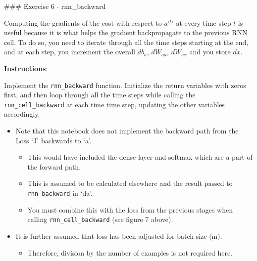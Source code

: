 \documentclass[11pt]{article}
\providecommand{\tightlist}{%
      \setlength{\itemsep}{0pt}\setlength{\parskip}{0pt}}
\begin{document}
    \#\#\# Exercise 6 - rnn\_backward

Computing the gradients of the cost with respect to
\(a^{\langle t \rangle}\) at every time step \(t\) is useful because it
is what helps the gradient backpropagate to the previous RNN cell. To do
so, you need to iterate through all the time steps starting at the end,
and at each step, you increment the overall \(db_a\), \(dW_{aa}\),
\(dW_{ax}\) and you store \(dx\).

\textbf{Instructions}:

Implement the \texttt{rnn\_backward} function. Initialize the return
variables with zeros first, and then loop through all the time steps
while calling the \texttt{rnn\_cell\_backward} at each time time step,
updating the other variables accordingly.

    \begin{itemize}
\tightlist
\item
  Note that this notebook does not implement the backward path from the
  Loss `J' backwards to `a'.

  \begin{itemize}
  \tightlist
  \item
    This would have included the dense layer and softmax which are a
    part of the forward path.
  \item
    This is assumed to be calculated elsewhere and the result passed to
    \texttt{rnn\_backward} in `da'.
  \item
    You must combine this with the loss from the previous stages when
    calling \texttt{rnn\_cell\_backward} (see figure 7 above).
  \end{itemize}
\item
  It is further assumed that loss has been adjusted for batch size (m).

  \begin{itemize}
  \tightlist
  \item
    Therefore, division by the number of examples is not required here.
  \end{itemize}
\end{itemize}
\end{document}
